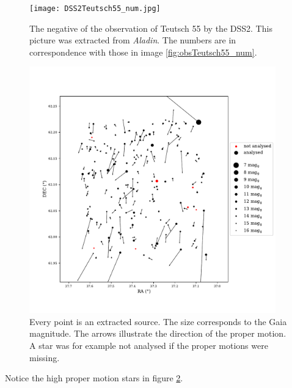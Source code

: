 \documentclass{article}
\begin{document}
\begin{figure}[H]
  \centering
    \texttt{[image: DSS2Teutsch55\_num.jpg]}
  \caption{The negative of the observation of Teutsch 55 by the DSS2. This picture was extracted from \textit{Aladin}. The numbers are in correspondence with those in image \ref{fig:obsTeutsch55_num}.}
  \label{fig:DSS2Teutsch55_num}
\end{figure}


\begin{figure}[H]
  \centering
    \includegraphics[trim={0 1.6cm 0 2.3cm},clip, width=0.95\textwidth]{Teutsch55_pm.pdf}
  \caption{Every point is an extracted source. The size corresponds to the Gaia magnitude. The arrows illustrate the direction of the proper motion. A star was for example not analysed if the proper motions were missing.}
  \label{fig:Teutsch55_pm}
\end{figure}

Notice the high proper motion stars in figure \ref{fig:Teutsch55_pm}. 
\end{document}
